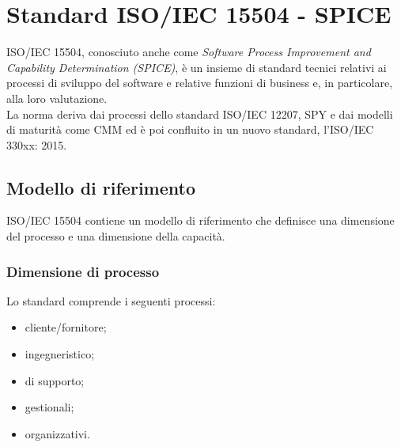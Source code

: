 \section{Standard ISO/IEC 15504 - SPICE}
ISO/IEC 15504, conosciuto anche come \textit{Software Process Improvement and Capability Determination (SPICE)}, è un insieme di standard tecnici relativi ai processi di sviluppo del software e relative funzioni di business e, in particolare, alla loro valutazione. \\
La norma deriva dai processi dello standard ISO/IEC 12207, SPY e dai modelli di maturità come CMM ed è poi confluito in un nuovo standard, l'ISO/IEC 330xx: 2015.

\subsection{Modello di riferimento}
ISO/IEC 15504 contiene un modello di riferimento che definisce una dimensione del processo e una dimensione della capacità.

\subsubsection{Dimensione di processo}
Lo standard comprende i seguenti processi:
\begin{itemize}
\item cliente/fornitore;
\item ingegneristico;
\item di supporto;
\item gestionali;
\item organizzativi.
\end{itemize}

